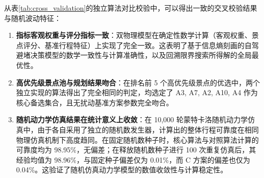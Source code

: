 \documentclass{cumcmthesis}
\begin{document}
\begin{table}[htbp]
\centering
\caption{双物理模型独立算法（核心剪枝算法 vs. 对照寻优算法）交叉验证校验表}
\label{tab:cross_validation}
\small
{}
\end{table}

从表\ref{tab:cross_validation}的独立算法对比校验中，可以得出一致的交叉校验结果与随机波动特征：
\begin{enumerate}
\item \textbf{指标客观权重与评分指标一致}：双物理模型在确定性数学计算（客观权重、景点评分、基准行程特征）上实现了完全一致。这表明了基于信息熵刻画的自驾避堵决策模型的数学一致性与计算准确性，以及回溯限界搜索所得解的全局最优性。
\item \textbf{高优先级景点池与规划结果吻合}：在排名前 5 个高优先级景点的优选中，两个独立实现的算法得出了完全相同的判定，均选定了 A3, A7, A2, A10, A4 作为核心备选集合，且无扰动基准方案参数完全吻合。
\item \textbf{随机动力学仿真结果在统计意义上收敛}：在 10,000 轮蒙特卡洛随机动力学仿真中，由于各自采用了独立的随机数发生器，计算出的整体行程可靠度在相同物理仿真机制下高度趋同。在固定随机数种子时，核心算法与对照算法计算的可靠度均为 98.95\%，无偏差；在释放随机数种子进行 100 次重复仿真后，其经验均值为 98.96\%，与固定种子偏差仅为 0.01\%，而 C 方案的偏差也仅为 0.04\%。这验证了随机仿真动力学模型的数值收敛性与计算稳定性。
\end{enumerate}
\end{document}
